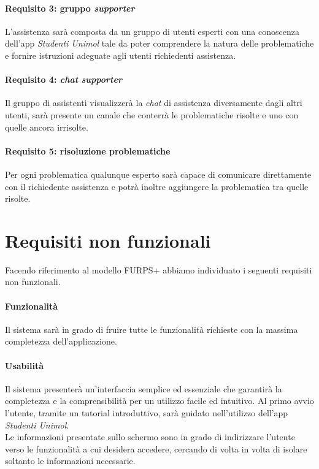\begin{enumerate}
\paragraph{Requisito 3: gruppo \emph{supporter}\\}
L’assistenza sarà composta da un gruppo di utenti esperti con una conoscenza dell’app \emph{Studenti Unimol} tale da poter comprendere la natura delle problematiche e fornire istruzioni adeguate agli utenti richiedenti assistenza. 

\paragraph{Requisito 4: \emph{chat} \emph{supporter}\\}
Il gruppo di assistenti visualizzerà la \emph{chat} di assistenza diversamente dagli altri utenti, sarà presente un canale che conterrà le problematiche risolte e uno con quelle ancora irrisolte.

\paragraph{Requisito 5: risoluzione problematiche\\}
Per ogni problematica qualunque esperto sarà capace di comunicare direttamente con il richiedente assistenza e potrà inoltre aggiungere la problematica tra quelle risolte. 

\section{Requisiti non funzionali}
Facendo riferimento al modello FURPS+ abbiamo individuato i seguenti requisiti
non funzionali.

\paragraph{Funzionalità\\} 
Il sistema sarà in grado di fruire tutte le funzionalità richieste con la massima completezza dell’applicazione.

\paragraph{Usabilità\\} 
Il sistema presenterà un’interfaccia semplice ed essenziale che garantirà la completezza e la comprensibilità per un utilizzo facile ed intuitivo. Al primo avvio l’utente, tramite un tutorial introduttivo, sarà guidato nell’utilizzo dell’app \emph{Studenti Unimol}.\\ 
Le informazioni presentate sullo schermo sono in grado di indirizzare l’utente verso le funzionalità a cui desidera accedere, cercando di volta in volta di isolare soltanto le informazioni necessarie.


\end{enumerate}
